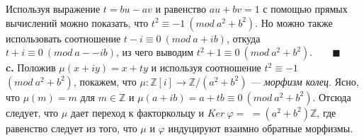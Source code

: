 \hspace*{10pt} Используя выражение $t=bu-av$ и равенство $au+bv=1$ с помощью\linebreak
прямых вычислений можно показать, что $t^2\equiv-1 ~(mod~a^2+b^2)$. Но\linebreak
можно также использовать соотношение $t-i\equiv0~(mod~a+ib)$, откуда\linebreak
$t+i\equiv0~(mod~a--ib)$, из чего выводим $t^2+1\equiv0~(mod~a^2+b^2)$.$\qquad \blacksquare$ \linebreak
\\
\hspace*{15pt}\textbf{c.} Положив $\mu(x+iy)=x+ty$ и используя соотношение $t^2\equiv-1$\linebreak
$(mod~a^2+b^2)$, покажем, что $\mu:\mathbb{Z}[i]\rightarrow\mathbb{Z}/(a^2+b^2)$ --- \textit{морфизм колец}.\linebreak
Ясно, что $\mu(m)=m$ для $m\in\mathbb{Z}$ и $\mu(a+ib)=a+tb\equiv0~(mod~a^2+b^2)$.\linebreak
Отсюда следует, что $\mu$ дает переход к факторкольцу и $Ker~\varphi=$\linebreak
$=(a^2+b^2)\mathbb{Z}$, где равенство следует из того, что $\mu$ и $\varphi$ индуцируют\linebreak
взаимно обратные морфизмы.\newpage
%

